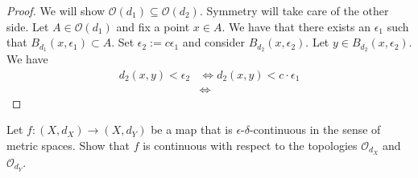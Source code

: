 \documentclass[a4paper]{article}
\begin{document}
    \begin{proof}
        We will show \(\mathcal{O}(d_1) \subseteq \mathcal{O}(d_2)\). Symmetry will take care of the other side. Let \(A \in \mathcal{O}(d_1)\) and fix a point \(x \in A\). We have that there exists an \(\epsilon_1\) such that \(B_{d_1}(x, \epsilon_1) \subset A\). Set \(\epsilon_2 := c \epsilon_1\) and consider \(B_{d_2}(x, \epsilon_2)\). Let \(y \in B_{d_2}(x, \epsilon_2)\). We have
        \begin{align}
            d_2(x, y) < \epsilon_2 & \iff d_2(x, y) < c \cdot \epsilon_1 \\
            & \iff
        \end{align}
    \end{proof}

    Let \(f: (X, d_X) \longrightarrow (X, d_Y)\) be a map that is \(\epsilon\)-\(\delta\)-continuous in the sense of metric spaces. Show that \(f\) is continuous with respect to the topologies \(\mathcal{O}_{d_X}\) and \(\mathcal{O}_{d_Y}\).

    
\end{document}
